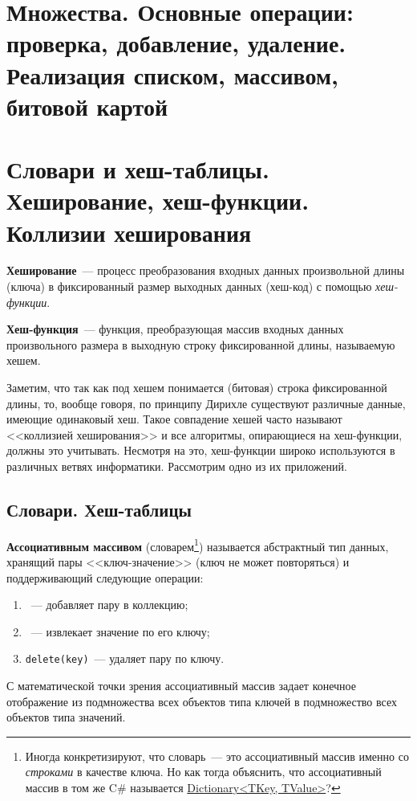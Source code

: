 \section{Множества. Основные операции: проверка, добавление, удаление. Реализация списком, массивом, битовой картой}
\section{Словари и хеш-таблицы. Хеширование, хеш-функции. Коллизии хеширования}
\textbf{Хеширование}~--- процесс преобразования входных данных произвольной длины (ключа) в фиксированный размер выходных данных (хеш-код) с помощью
\textit{хеш-функции}.

\textbf{Хеш-функция}~--- функция, преобразующая массив входных данных произвольного размера в выходную строку фиксированной длины, называемую хешем.

Заметим, что так как под хешем понимается (битовая) строка фиксированной длины, то, вообще говоря, по принципу Дирихле существуют различные данные,
имеющие одинаковый хеш. Такое совпадение хешей часто называют <<коллизией хеширования>> и все алгоритмы, опирающиеся на хеш-функции, должны это
учитывать. Несмотря на это, хеш-функции широко используются в различных ветвях информатики. Рассмотрим одно из их приложений.

\subsection{Словари. Хеш-таблицы}
\textbf{Ассоциативным массивом} (словарем\footnote{Иногда конкретизируют, что словарь~--- это ассоциативный массив именно со \textit{строками} в качестве ключа.
Но как тогда объяснить, что ассоциативный массив в том же C\# называется \href{https://learn.microsoft.com/en-us/dotnet/api/system.collections.generic.dictionary-2}{Dictionary<TKey, TValue>}?})
называется абстрактный тип данных, хранящий пары <<ключ-значение>> (ключ не может повторяться) и поддерживающий следующие операции:
\begin{enumerate}
  \item {}~--- добавляет пару в коллекцию;
  \item {}~--- извлекает значение по его ключу;
  \item \verb|delete(key)|~--- удаляет пару по ключу.
\end{enumerate}

С математической точки зрения ассоциативный массив задает конечное отображение из подмножества всех объектов типа ключей в подмножество всех
объектов типа значений.

